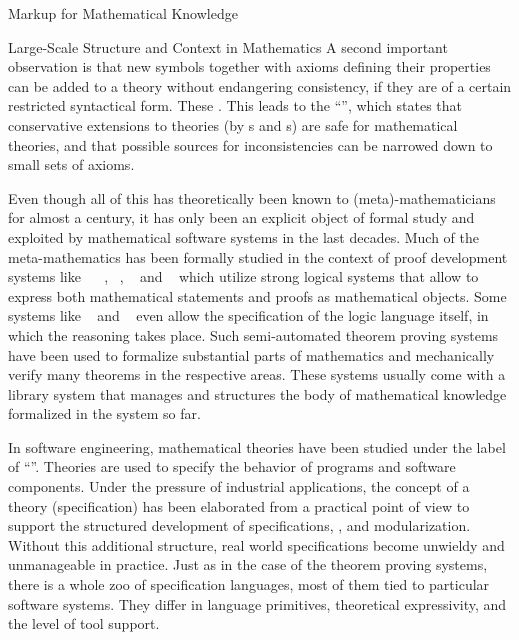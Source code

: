 \begin{omgroup}[id=math-markup]{Markup for Mathematical Knowledge}
\begin{module}[id=math-context]
\begin{omgroup}[id=meta-theories]{Large-Scale Structure and Context in Mathematics}
A second important observation is that new symbols together with axioms defining their
properties can be added to a theory without endangering consistency, if they are of a
certain restricted syntactical form. These .  This leads to the ``{\emph{}}'', which states that conservative extensions to
theories (by {s} and {s}) are safe for mathematical
theories, and that possible sources for inconsistencies can be
narrowed down to small sets of axioms.

  Even though all of this has theoretically been known to (meta)-mathema\-ticians for
  almost a century, it has only been an explicit object of formal study and exploited by
  mathematical software systems in the last decades. Much of the meta-mathematics has been
  formally studied in the context of proof development systems like
  {\automath}~\cite{Bruijn80} {\nuprl}~\cite{Constable86}, {\hol}~\cite{GoMe93},
  {\mizar}~\cite{Rudnicki:aomp92} and {\OMEGA}~\cite{BenzmuellerEtAl:otama97} which
  utilize strong logical systems that allow to express both mathematical statements and
  proofs as mathematical objects.  Some systems like {\isabelle}~\cite{Paulson90} and
  {}~\cite{Pfenning91} even allow the specification of the logic language
  itself, in which the reasoning takes place.  Such semi-automated theorem proving systems
  have been used to formalize substantial parts of mathematics and mechanically verify
  many theorems in the respective areas. These systems usually come with a library system
  that manages and structures the body of mathematical knowledge formalized in the system
  so far.

  In software engineering, mathematical theories have been studied under the label of
  ``''. Theories are used to
  specify the behavior of programs and software components. Under the pressure of
  industrial applications, the concept of a theory (specification) has been elaborated
  from a practical point of view to support the structured development of specifications,
  {}, and modularization.  Without this additional structure, real
  world specifications become unwieldy and unmanageable in practice. Just as in the case
  of the theorem proving systems, there is a whole zoo of specification languages, most of
  them tied to particular software systems.  They differ in language primitives,
  theoretical expressivity, and the level of tool support.


\end{omgroup}
\end{module}
\end{omgroup}
